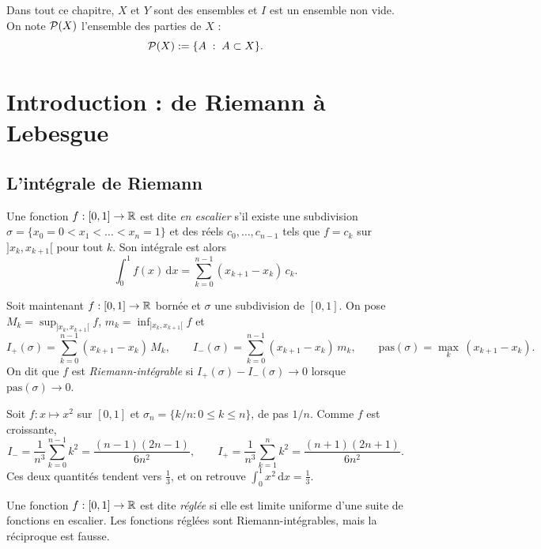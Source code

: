 \documentclass[11pt]{article}
\begin{document}

Dans tout ce chapitre, $X$ et $Y$ sont des ensembles et $I$ est un ensemble non vide. On note $\mathcal{P}(X)$ l'ensemble des parties de $X$ :
\[
  \mathcal{P}(X) := \{A \;:\; A \subset X\}.
\]

\setcounter{section}{-1}
\section{Introduction : de Riemann à Lebesgue}

\subsection*{L'intégrale de Riemann}

\begin{definition}
Une fonction $f : [0,1] \to \mathbb{R}$ est dite \emph{en escalier} s'il existe une subdivision $\sigma = \{x_0 = 0 < x_1 < \dots < x_n = 1\}$ et des réels $c_0,\dots,c_{n-1}$ tels que $f = c_k$ sur $]x_k,x_{k+1}[$ pour tout $k$. Son intégrale est alors
\[
  \int_0^1 f(x)\,\mathrm{d}x = \sum_{k=0}^{n-1} (x_{k+1}-x_k)\,c_k.
\]
\end{definition}

Soit maintenant $f : [0,1] \to \mathbb{R}$ bornée et $\sigma$ une subdivision de $[0,1]$. On pose $M_k = \sup_{]x_k,x_{k+1}[} f$, $m_k = \inf_{]x_k,x_{k+1}[} f$ et
\[
  I_+(\sigma) = \sum_{k=0}^{n-1}(x_{k+1}-x_k)\,M_k,
  \qquad
  I_-(\sigma) = \sum_{k=0}^{n-1}(x_{k+1}-x_k)\,m_k,
  \qquad
  \mathrm{pas}(\sigma) = \max_{k}\,(x_{k+1}-x_k).
\]
On dit que $f$ est \emph{Riemann-intégrable} si $I_+(\sigma) - I_-(\sigma) \to 0$ lorsque $\mathrm{pas}(\sigma) \to 0$.

\begin{exemple}
Soit $f : x \mapsto x^2$ sur $[0,1]$ et $\sigma_n = \{k/n : 0 \leq k \leq n\}$, de pas $1/n$. Comme $f$ est croissante,
\[
  I_- = \frac{1}{n^3}\sum_{k=0}^{n-1}k^2 = \frac{(n-1)(2n-1)}{6n^2},
  \qquad
  I_+ = \frac{1}{n^3}\sum_{k=1}^{n}k^2 = \frac{(n+1)(2n+1)}{6n^2}.
\]
Ces deux quantités tendent vers $\frac13$, et on retrouve $\int_0^1 x^2\,\mathrm{d}x = \frac13$.
\end{exemple}

\begin{definition}
Une fonction $f : [0,1] \to \mathbb{R}$ est dite \emph{réglée} si elle est limite uniforme d'une suite de fonctions en escalier. Les fonctions réglées sont Riemann-intégrables, mais la réciproque est fausse.
\end{definition}
\end{document}
